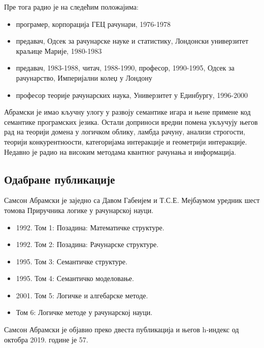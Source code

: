 \documentclass[a4paper]{article}
\begin{document}
Пре тога радио је на следећим положајима:

\begin{itemize}
\item     програмер, корпорација ГЕЦ рачунари, 1976-1978
\item     предавач, Одсек за рачунарске науке и статистику, Лондонски универзитет краљице Марије, 1980-1983
\item     предавач, 1983-1988, читач, 1988-1990, професор, 1990-1995, Одсек за рачунарство, Империјални колеџ у Лондону
\item     професор теорије рачунарских наука, Универзитет у Единбургу, 1996-2000
\end{itemize}
Абрамски је имао кључну улогу у развоју семантике игара и њене примене код семантике програмских језика. Остали доприноси вредни помена укључују његов рад на теорији домена у логичком облику, ламбда рачуну, анализи строгости, теорији конкурентноости, категоријама интеракције и геометрији интеракције. Недавно је радио на високим методама квантног рачунања и информација. 
\subsection{Одабране публикације}	
Самсон Абрамски је заједно са Давом Габеијем и Т.С.Е. Мејбаумом уредник шест томова Приручника логике у рачунарској науци. 
\begin{itemize}
\item     1992. Том 1: Позадина: Математичке структуре.
\item     1992. Том 2: Позадина: Рачунарске структуре.
\item     1995. Том 3: Семантичке структуре.
\item     1995. Том 4: Семантичко моделовање.
\item     2001. Том 5: Логичке и алгебарске методе.
\item 	  Том 6: Логичке методе у рачунарској науци.
\end{itemize}

Самсон Абрамски је објавио преко двеста публикација и његов h-индекс од октобра 2019. године је 57.\cite{publ}
\end{document}
